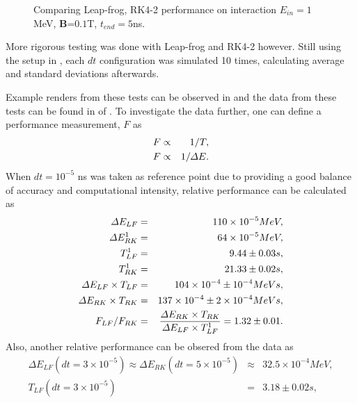 \documentclass[a4paper,oneside,12pt]{report}
\numberwithin{equation}{chapter}
\begin{document}
{\begin{figure}[h]
    \vspace{20pt}
    \caption{Comparing Leap-frog, RK4-2 performance on \eB interaction $E_{in}=1$MeV, \textbf{B}=$0.1$T, $t_{end}=5$ns.}
    \label{fig:mag_lf_rk2_comparison}
\end{figure}
More rigorous testing was done with Leap-frog and RK4-2 however. 
Still using the setup in , each $dt$ configuration was simulated 10 times, calculating average and standard deviations afterwards.

Example renders from these tests can be observed in  and
the data from these tests can be found in  of .
To investigate the data further, one can define a performance measurement, $F$ as
\vspace{-10pt}\begin{eqnarray}
    F &\propto& 1/T  , \\
    F &\propto& 1/\Delta E . 
\vspace{-10pt}\end{eqnarray}
When $dt=10^{-5}$ ns was taken as reference point due to providing a good balance of accuracy and computational intensity, 
relative performance can be calculated as
\vspace{-10pt}\begin{eqnarray} \label{eq:f_lf_rk_mag_1}
    \Delta E_{LF} &=& 110 \times 10^{-5} MeV,\\
    \Delta E_{RK}^1 &=& 64 \times 10^{-5} MeV,\\
    T_{LF}^1 &=& 9.44 \pm 0.03 s, \\
    T_{RK}^1 &=& 21.33 \pm 0.02 s, \\
    \Delta E_{LF} \times T_{LF} &=& 104 \times 10^{-4} \pm 10^{-4} MeV s, \\ %
    \Delta E_{RK} \times T_{RK} &=& 137 \times 10^{-4} \pm 2\times 10^{-4}  MeV s, \\ %
    F_{LF}/F_{RK} &=& \frac{\Delta E_{RK} \times T_{RK} }{\Delta E_{LF} \times T_{LF}^1} = 1.32 \pm 0.01 .
\vspace{-10pt}\end{eqnarray}
Also, another relative performance can be obsered from the data as
\vspace{-10pt}\begin{eqnarray} \label{eq:f_lf_rk_mag_2}
    \Delta E_{LF} (dt=3 \times 10^{-5}) \approx \Delta E_{RK} (dt=5 \times 10^{-5}) &\approx& 32.5 \times 10^{-4} MeV, \\
    T_{LF}(dt=3 \times 10^{-5})  &=& 3.18 \pm 0.02 s, \\ %

\end{eqnarray}}
\end{document}
